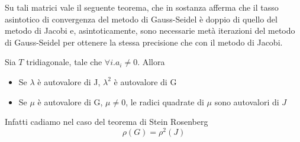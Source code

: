 Su tali matrici vale il seguente teorema, che in sostanza afferma che
il tasso asintotico di convergenza del metodo di Gauss-Seidel \`e  doppio
di quello del metodo di Jacobi e, asintoticamente, sono necessarie met\`a
iterazioni del metodo di Gauss-Seidel per ottenere la stessa precisione che
con il metodo di Jacobi.

\begin{theo}
 Sia $T$ tridiagonale, tale che $\forall i.a_{i}\neq 0$. Allora
\begin{itemize}
 \item Se $\lambda$ \`e autovalore di J, $\lambda^{2}$ \`e autovalore di G
 \item Se $\mu$ \`e autovalore di G, $\mu \neq 0 $, le radici quadrate di $\mu$
    sono autovalori di $J$
\end{itemize}
\end{theo}
Infatti cadiamo nel caso del teorema di Stein Rosenberg
$$ \rho(G)  = \rho^{2}(J)$$
